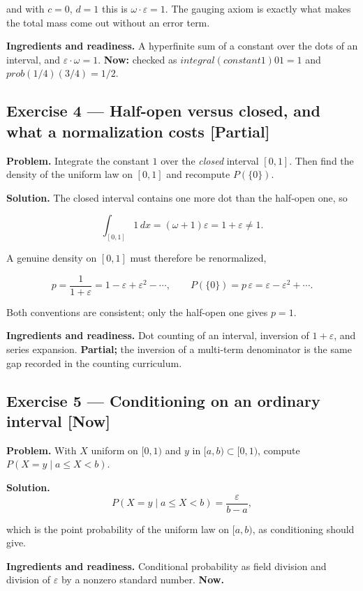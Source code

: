 \documentclass[11pt]{article}
\newcommand{\eps}{\varepsilon}
\renewcommand{\epsilon}{\varepsilon}
\begin{document}
and with $c = 0$, $d = 1$ this is $\omega\cdot \eps = 1$. The gauging axiom is
exactly what makes the total mass come out without an error term.

\textbf{Ingredients and readiness.} A hyperfinite sum of a constant over the dots
of an interval, and $\eps\cdot \omega = 1$. \textbf{Now:} checked as
$integral (constant 1) 0 1 = 1$ and $prob (1/4) (3/4) = 1/2$.


\subsection*{Exercise 4 --- Half-open versus closed, and what a normalization costs \hfill \normalfont\small[Partial]}

\textbf{Problem.} Integrate the constant $1$ over the \emph{closed} interval $[0,1]$. Then
find the density of the uniform law on $[0,1]$ and recompute $P(\{0\})$.

\textbf{Solution.} The closed interval contains one more dot than the half-open
one, so

\[
\int_{[0,1]} 1\,dx=(\omega+1)\epsilon=1+\epsilon\neq 1 .
\]

A genuine density on $[0,1]$ must therefore be renormalized,

\[
p=\frac1{1+\epsilon}=1-\epsilon+\epsilon^{2}-\cdots,
\qquad
P(\{0\})=p\,\epsilon=\epsilon-\epsilon^{2}+\cdots .
\]

Both conventions are consistent; only the half-open one gives $p = 1$.

\textbf{Ingredients and readiness.} Dot counting of an interval, inversion of
$1 + \eps$, and series expansion. \textbf{Partial;} the inversion of a
multi-term denominator is the same gap recorded in the counting curriculum.


\subsection*{Exercise 5 --- Conditioning on an ordinary interval \hfill \normalfont\small[Now]}

\textbf{Problem.} With $X$ uniform on $[0,1)$ and $y$ in $[a,b)\subset [0,1)$,
compute $P(X = y\mid a \le  X < b)$.

\textbf{Solution.} \[
P(X=y \mid a\le X<b)=\frac{\epsilon}{b-a},
\]

which is the point probability of the uniform law on $[a,b)$, as conditioning
should give.

\textbf{Ingredients and readiness.} Conditional probability as field division and
division of $\eps$ by a nonzero standard number. \textbf{Now.}
\end{document}
